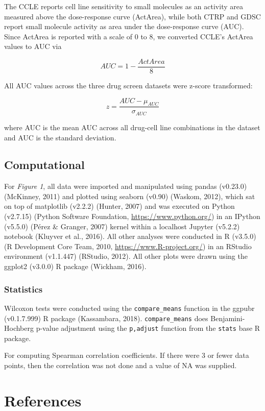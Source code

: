 \documentclass[man,floatsintext]{apa6}
\begin{document}
The CCLE reports cell line sensitivity to small molecules as an activity
area measured above the dose-response curve (ActArea), while both CTRP
and GDSC report small molecule activity as area under the dose-response
curve (AUC). Since ActArea is reported with a scale of 0 to 8, we
converted CCLE's ActArea values to AUC via

\[AUC=1- \frac{ActArea}{8}\]

All AUC values across the three drug screen datasets were z-score
transformed:

\[z = \frac{AUC - \mu_{AUC}}{\sigma_{AUC}}\]

where AUC is the mean AUC across all drug-cell line combinations in the
dataset and AUC is the standard deviation.

\subsection{Computational}\label{computational}

For \emph{Figure 1}, all data were imported and manipulated using pandas
(v0.23.0) (McKinney, 2011) and plotted using seaborn (v0.90) (Waskom,
2012), which sat on top of matplotlib (v2.2.2) (Hunter, 2007) and was
executed on Python (v2.7.15) (Python Software Foundation,
\url{https://www.python.org/}) in an IPython (v5.5.0) (Pérez \& Granger,
2007) kernel within a localhost Jupyter (v5.2.2) notebook (Kluyver et
al., 2016). All other analyses were conducted in R (v3.5.0) (R
Development Core Team, 2010, \url{https://www.R-project.org/}) in an
RStudio environment (v1.1.447) (RStudio, 2012). All other plots were
drawn using the ggplot2 (v3.0.0) R package (Wickham, 2016).

\subsubsection{Statistics}\label{statistics}

Wilcoxon tests were conducted using the \texttt{compare\_means} function
in the ggpubr (v0.1.7.999) R package (Kassambara, 2018).
\texttt{compare\_means} does Benjamini-Hochberg p-value adjustment using
the \texttt{p,adjust} function from the \texttt{stats} base R package.

For computing Spearman correlation coefficients. If there were 3 or
fewer data points, then the correlation was not done and a value of NA
was supplied.

\newpage

\section{References}\label{references}
\end{document}
